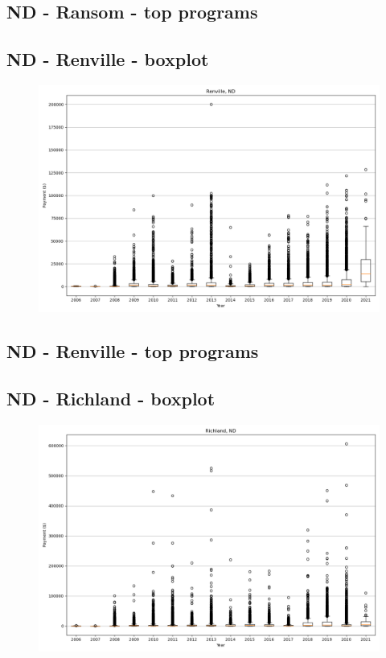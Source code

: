 \subsection*{ND - Ransom - top programs}

\newpage
\subsection*{ND - Renville - boxplot}
\begin{figure}[h]
\centering
\includegraphics[width=7in]{../output/boxplots/counties/Renville-ND_boxplot.png}
\end{figure}


\subsection*{ND - Renville - top programs}

\newpage
\subsection*{ND - Richland - boxplot}
\begin{figure}[h]
\centering
\includegraphics[width=7in]{../output/boxplots/counties/Richland-ND_boxplot.png}
\end{figure}



